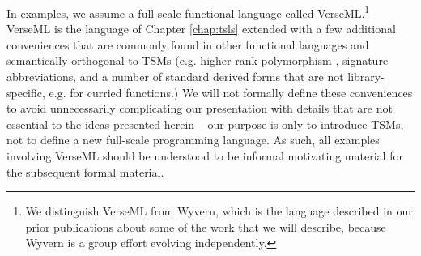 In examples, we assume a full-scale functional language called VerseML.\footnote{We distinguish VerseML from Wyvern, which is the language described in our prior publications about some of the work that we will describe, because Wyvern is a group effort evolving independently.} VerseML is the language of Chapter \ref{chap:tsls}  extended with a few additional conveniences that are commonly found in other functional languages and semantically orthogonal to TSMs (e.g. higher-rank polymorphism \cite{conf/icfp/DunfieldK13}, signature abbreviations, and a number of standard derived forms that are not library-specific, e.g. for curried functions.) %
We will not formally define these conveniences to avoid unnecessarily complicating our presentation with details that are not essential to the ideas presented herein -- our purpose is only to introduce TSMs, not to define a new full-scale programming language. As such, all examples involving VerseML should be understood to be informal motivating material for the subsequent formal material. %



